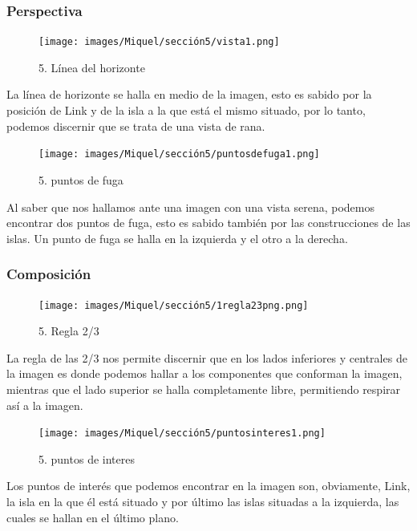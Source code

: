\documentclass[12pt]{article}
\begin{document}
        \subsubsection{Perspectiva}

    \begin{figure}[H]
      \centering
      \texttt{[image: images/Miquel/sección5/vista1.png]}
      \caption{\small 5. Línea del horizonte}
    \end{figure}

    La línea de horizonte se halla en medio de la imagen, esto es sabido por la posición de Link y de la isla a la que está el mismo situado, por lo tanto, podemos discernir que se trata de una vista de rana.


    \begin{figure}[H]
      \centering
      \texttt{[image: images/Miquel/sección5/puntosdefuga1.png]}
      \caption{\small 5. puntos de fuga}
    \end{figure}

    Al saber que nos hallamos ante una imagen con una vista serena, podemos encontrar dos puntos de fuga, esto es sabido también por las construcciones  de las islas. Un punto de fuga se halla en la izquierda y el otro a la derecha.


        \subsubsection{Composición}
    \begin{figure}[H]
      \centering
      \texttt{[image: images/Miquel/sección5/1regla23png.png]}
      \caption{\small 5. Regla 2/3}
    \end{figure}
    
    La regla de las 2/3 nos permite discernir que en los lados inferiores y centrales de la imagen es donde podemos hallar a los componentes que conforman la imagen, mientras que el lado superior se halla completamente libre, permitiendo respirar así a la imagen.

    \begin{figure}[H]
      \centering
      \texttt{[image: images/Miquel/sección5/puntosinteres1.png]}
      \caption{\small 5. puntos de interes}
    \end{figure}

    Los puntos de interés que podemos encontrar en la imagen son, obviamente, Link, la isla en la que él está situado y por último las islas situadas a la izquierda, las cuales se hallan en el último plano.
\end{document}
